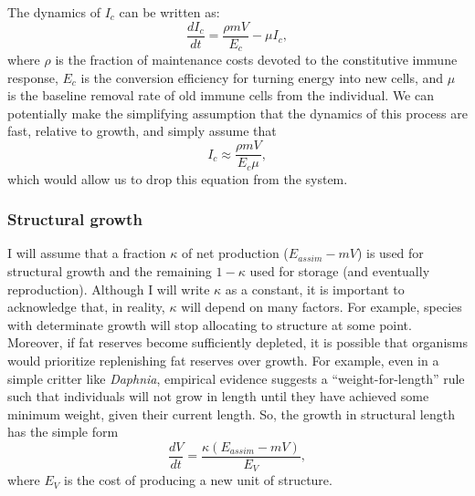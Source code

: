 \documentclass[11pt,reqno,final,pdftex]{amsart}\usepackage[]{graphicx}\usepackage[]{color}
\theoremstyle{plain}
\numberwithin{equation}{part}
\begin{document}
The dynamics of $I_c$ can be written as:
\begin{equation}
\frac{dI_c}{dt} = \frac{\rho m V}{E_c} - \mu I_c,
\end{equation}
where $\rho$ is the fraction of maintenance costs devoted to the constitutive immune response, $E_c$ is the conversion efficiency for turning energy into new cells, and $\mu$ is the baseline removal rate of old immune cells from the individual.
We can potentially make the simplifying assumption that the dynamics of this process are fast, relative to growth, and simply assume that
\begin{equation}
I_c \approx \frac{\rho m V}{E_c \mu},
\end{equation}
which would allow us to drop this equation from the system.

\subsubsection*{Structural growth}
I will assume that a fraction $\kappa$ of net production ($E_{assim}-m V$) is used for structural growth and the remaining $1-\kappa$ used for storage (and eventually reproduction).
Although I will write $\kappa$ as a constant, it is important to acknowledge that, in reality, $\kappa$ will depend on many factors.
For example, species with determinate growth will stop allocating to structure at some point.
Moreover, if fat reserves become sufficiently depleted, it is possible that organisms would prioritize replenishing fat reserves over growth.
For example, even in a simple critter like \emph{Daphnia}, empirical evidence suggests a ``weight-for-length'' rule such that individuals will not grow in length until they have achieved some minimum weight, given their current length.
So, the growth in structural length has the simple form
\begin{equation}
\frac{dV}{dt} = \frac{\kappa(E_{assim}-mV)}{E_V},
\end{equation}
where $E_V$ is the cost of producing a new unit of structure.
\end{document}
